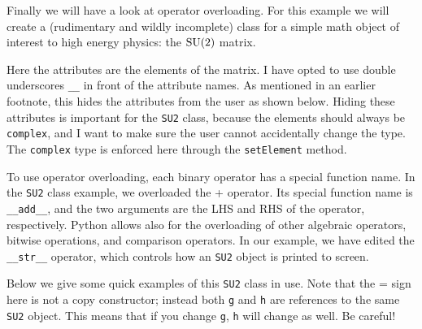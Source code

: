\begin{code*}
\end{code*}
\begin{code*}
\end{code*}
\begin{code*}
\end{code*}

Finally we will have a look at operator overloading. For this example we
will create a (rudimentary and wildly incomplete) class for a simple math 
object of interest to high energy physics: the $\operatorname{SU}(2)$ matrix.\\

\begin{code*}
\end{code*}

Here the attributes are the elements of the matrix. 
I have opted to use double underscores \texttt{\_\_} in front of
the attribute names. As mentioned in an earlier footnote, this hides the
attributes from the user as shown below.
Hiding these attributes is important for the \texttt{SU2} class, because the
elements should always be \texttt{complex}, and I want to make sure the
user cannot accidentally change the type. The \texttt{complex} type is
enforced here through the \texttt{setElement} method.

\begin{code*}
\end{code*}
\begin{code*}
\end{code*}

To use operator overloading, each binary operator has a special function name.
In the \texttt{SU2} class example, we overloaded the + operator. Its special
function name is \texttt{\_\_add\_\_}, and the two arguments are the LHS and
RHS of the operator, respectively. Python allows also for the overloading
of other algebraic operators, bitwise operations, and comparison operators.
In our example, we have edited the \texttt{\_\_str\_\_} operator, which
controls how an \texttt{SU2} object is printed to screen.

Below we give some quick examples of this \texttt{SU2} class in use. Note that
the = sign here is not a copy constructor; instead both \texttt{g} and
\texttt{h} are references to the same \texttt{SU2} object. This means that
if you change \texttt{g}, \texttt{h} will change as well. Be careful!\\ 

